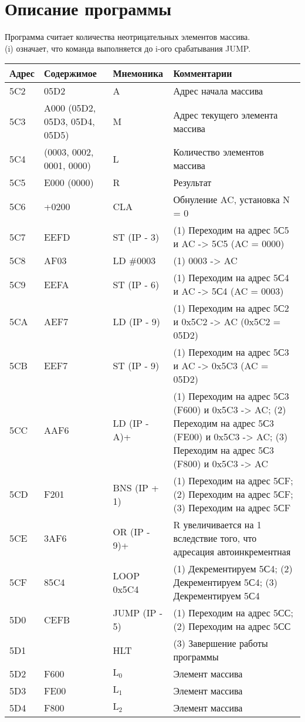 \section{Описание программы}
Программа считает количества неотрицательных элементов массива. \\
(i) означает, что команда выполняется до i-ого срабатывания JUMP.
\begin{table}[H]
\centering
\begin{tabular}{|>{\centering\arraybackslash}p{1cm}|>{\centering\arraybackslash}p{3cm}|>{\centering\arraybackslash}p{3cm}|>{\arraybackslash}p{8cm}|}
\hline
Адрес & Содержимое & Мнемоника & Комментарии \\\hline
5C2 & 05D2 & A & Адрес начала массива  \\\hline
5C3 & A000 (05D2, 05D3, 05D4, 05D5) & M & Адрес текущего элемента массива \\\hline
5C4 & 4000 (0003, 0002, 0001, 0000) & L & Количество элементов массива \\\hline
5C5 & E000 (0000) & R & Результат \\\hline
5C6 & +0200 & CLA & Обнуление AC, установка N = 0 \\\hline
5C7 & EEFD & ST (IP - 3)  & (1) Переходим на адрес 5С5 и AC -> 5C5 (AC = 0000) \\\hline
5C8 & AF03 & LD \#0003 & (1) 0003 -> AC \\\hline
5C9 & EEFA & ST (IP - 6) & (1) Переходим на адрес 5С4 и AC -> 5С4 (AC = 0003) \\\hline
5CA & AEF7 & LD (IP - 9) & (1) Переходим на адрес 5С2 и 0x5C2 -> AC (0x5C2 = 05D2) \\\hline
5CB & EEF7 & ST (IP - 9) & (1) Переходим на адрес 5С3 и AC -> 0x5C3 (AC = 05D2) \\\hline
5CC & AAF6 & LD (IP - A)+ & (1) Переходим на адрес 5С3 (F600) и 0x5C3 -> AC; (2) Переходим на адрес 5С3 (FE00) и 0x5C3 -> AC; (3) Переходим на адрес 5С3 (F800) и 0x5C3 -> AC \\\hline
5CD & F201 & BNS (IP + 1)  & (1) Переходим на адрес 5СF; (2) Переходим на адрес 5СF; (3) Переходим на адрес 5СF \\\hline
5CE & 3AF6 & OR (IP - 9)+ & R увеличивается на 1 вследствие того, что адресация автоинкрементная  \\\hline
5CF & 85C4 & LOOP 0x5C4 & (1) Декрементируем 5С4; (2) Декрементируем 5С4; (3) Декрементируем 5С4 \\\hline
5D0 & CEFB & JUMP (IP - 5) & (1) Переходим на адрес 5СС; (2) Переходим на адрес 5СС \\\hline
5D1 & 0100 & HLT & (3) Завершение работы программы \\\hline
5D2 & F600 & $\text{L}_{0}$ &  Элемент массива \\\hline
5D3 & FE00 & $\text{L}_{1}$ & Элемент массива \\\hline
5D4 & F800 & $\text{L}_{2}$ & Элемент массива \\\hline
\end{tabular}
\end{table}

